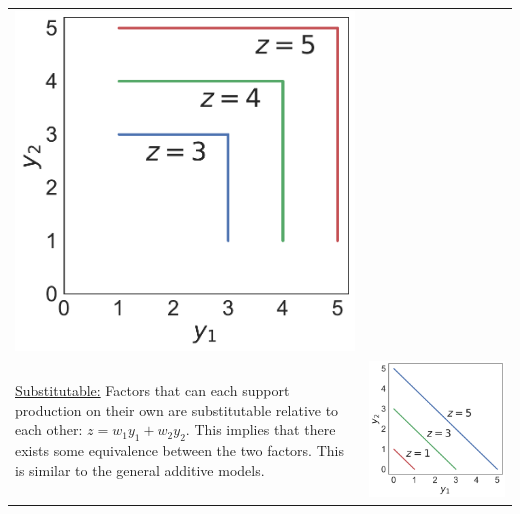 \begin{table}[h!]
\begin{tabular}{m{}c}
\begin{minipage}{.17\textwidth}
      \includegraphics[width=\textwidth, height=.975\textwidth]{Figures/Antagonistic.pdf}
    \end{minipage}
    \\
    \vspace{-5pt}
    \uline{Substitutable:} Factors that can each support production on their own are substitutable relative to each other: $z = w_1y_1 + w_2y_2$. This implies that there exists some equivalence between the two factors. This is similar to the general additive models.
    &
    \begin{minipage}{.17\textwidth}
      \includegraphics[width=\textwidth, height=.975\textwidth]{Figures/Substitutable.pdf}

\end{minipage}
\end{tabular}
\end{table}
